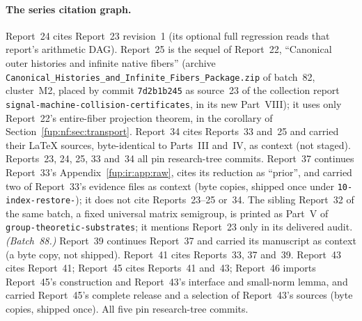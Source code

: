 \documentclass[11pt,letterpaper]{article}
\theoremstyle{definition}\newtheorem{definition}[theorem]{Definition}
\theoremstyle{remark}\newtheorem{remark}[theorem]{Remark}
\newcommand{\rw}[1]{\nolinkurl{#1}}%
\begin{document}
\paragraph{The series citation graph.} Report~24 cites Report~23 revision~1 (its optional full regression reads that report's arithmetic DAG). Report~25 is the sequel of Report~22, ``Canonical outer histories and infinite native fibers'' (archive \rw{Canonical_Histories_and_Infinite_Fibers_Package.zip} of batch~82, cluster~M2, placed by commit \texttt{7d2b1b245} as source~23 of the collection report \rw{signal-machine-collision-certificates}, in its new Part~VIII); it uses only Report~22's entire-fiber projection theorem, in the corollary of Section~\ref{fup:nf:sec:transport}. Report~34 cites Reports~33 and~25 and carried their LaTeX sources, byte-identical to Parts~III and~IV, as context (not staged). Reports~23, 24, 25, 33 and~34 all pin research-tree commits. Report~37 continues Report~33's Appendix~\ref{fup:ir:app:raw}, cites its reduction as ``prior'', and carried two of Report~33's evidence files as context (byte copies, shipped once under \texttt{10-index-restore-}); it does not cite Reports~23--25 or~34. The sibling Report~32 of the same batch, a fixed universal matrix semigroup, is printed as Part~V of \rw{group-theoretic-substrates}; it mentions Report~23 only in its delivered audit. \emph{(Batch~88.)} Report~39 continues Report~37 and carried its manuscript as context (a byte copy, not shipped). Report~41 cites Reports~33, 37 and~39. Report~43 cites Report~41; Report~45 cites Reports~41 and~43; Report~46 imports Report~45's construction and Report~43's interface and small-norm lemma, and carried Report~45's complete release and a selection of Report~43's sources (byte copies, shipped once). All five pin research-tree commits.
\end{document}
